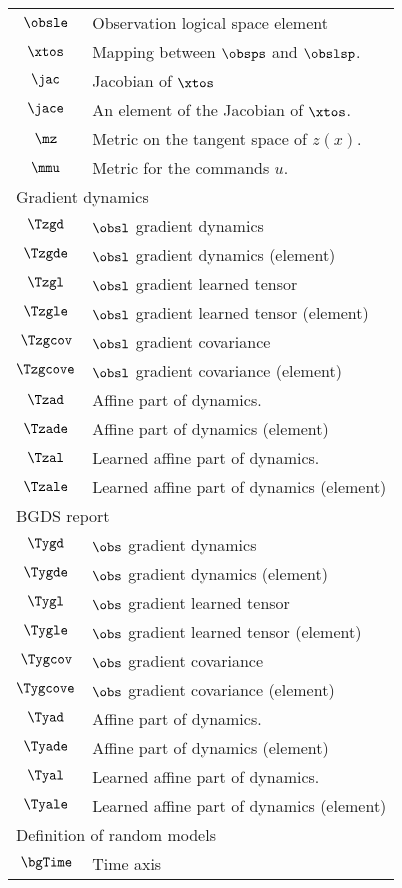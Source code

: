 \begin{longtable}{cl}
 $\obsle$ &  Observation logical space element\\ 
 $\xtos$ &  Mapping between $\obsps$ and $\obslsp$.\\ 
 $\jac$ &  Jacobian of $\xtos$\\ 
 $\jace$ &  An element of the Jacobian of $\xtos$.\\ 
 $\mz$ &  Metric on the tangent space of $z(x)$.\\ 
 $\mmu$ &  Metric for the commands $u$. \\ 
 \multicolumn{2}{l}{Gradient dynamics}\\ 
 \hline
$\Tzgd$ &  $\obsl$  gradient dynamics\\ 
 $\Tzgde$ &  $\obsl$  gradient dynamics (element)\\ 
 $\Tzgl$ &  $\obsl$  gradient  learned tensor \\ 
 $\Tzgle$ &  $\obsl$  gradient  learned tensor (element)\\ 
 $\Tzgcov$ &  $\obsl$  gradient  covariance\\ 
 $\Tzgcove$ &  $\obsl$  gradient  covariance (element)\\ 
 $\Tzad$ &  Affine part of dynamics.\\ 
 $\Tzade$ &  Affine part of dynamics (element)\\ 
 $\Tzal$ &  Learned affine part of dynamics.\\ 
 $\Tzale$ &  Learned affine part of dynamics (element)\\ 
 \multicolumn{2}{l}{BGDS report}\\ 
 \hline
$\Tygd$ &  $\obs$ gradient dynamics\\ 
 $\Tygde$ &  $\obs$ gradient dynamics (element)\\ 
 $\Tygl$ &  $\obs$ gradient learned tensor \\ 
 $\Tygle$ &  $\obs$ gradient learned tensor (element)\\ 
 $\Tygcov$ &  $\obs$ gradient covariance\\ 
 $\Tygcove$ &  $\obs$ gradient covariance (element)\\ 
 $\Tyad$ &  Affine part of dynamics.\\ 
 $\Tyade$ &  Affine part of dynamics (element)\\ 
 $\Tyal$ &  Learned affine part of dynamics.\\ 
 $\Tyale$ &  Learned affine part of dynamics (element)\\ 
 \multicolumn{2}{l}{Definition of random models}\\ 
 \hline
$\bgTime$ &  Time axis\\ 

\end{longtable}

